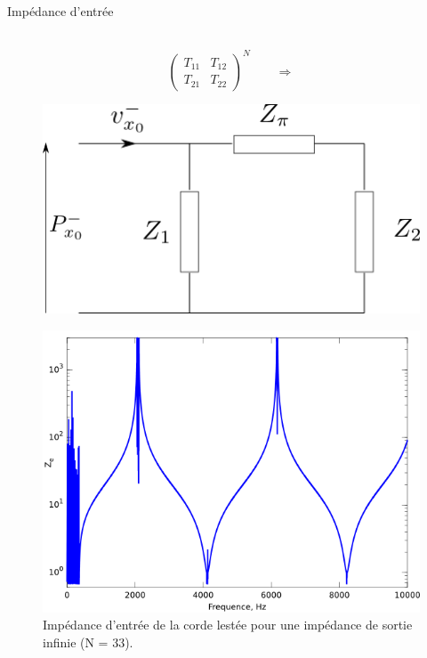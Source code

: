 \documentclass[xcolor=x11names,compress]{beamer}
\renewcommand{\(}{\begin{columns}}
\renewcommand{\)}{\end{columns}}
\newcommand{\<}[1]{\begin{column}{#1}}
\renewcommand{\>}{\end{column}}
\begin{document}
\begin{frame}{Impédance d'entrée}
\begin{minipage}[t]{0.49\textwidth}
~\\
	\begin{equation*}
		\begin{pmatrix} T_{11} & T_{12}\\ T_{21} & T_{22} \end{pmatrix}^{N}\qquad \Rightarrow 
	\end{equation*}
\end{minipage}
\begin{minipage}[t]{0.49\textwidth}
	\begin{figure}
		\flushleft
		\includegraphics[scale=0.3]{./figures/schema_elec_impedance.png}
	\end{figure}
\end{minipage}
\begin{figure}[!h]\centering
\includegraphics[scale = 0.35]{./figures/impedance_entree.png}
\caption*{\scriptsize Impédance d'entrée de la corde lestée pour une impédance de sortie infinie (N = 33).}
\end{figure}

\end{frame}
\end{document}
